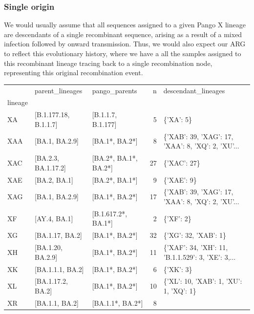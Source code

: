 \documentclass{article}
\begin{document}
\subsubsection{Single origin}
We would usually assume that all sequences assigned to a given Pango X lineage are descendants of a single recombinant sequence, arising as a result of a mixed infection followed by onward transmission. Thus, we would also expect our ARG to reflect this evolutionary history, where we have a all the samples assigned to this recombinant lineage tracing back to a single recombination node, representing this original recombination event.

\begin{table}
\begin{tabular}{lllrl}
\toprule
{} &              parent\_lineages &          pango\_parents &   n &
descendant\_lineages \\
lineage &                              &                        &     &
\\
\midrule
XA      &        [B.1.177.18, B.1.1.7] &     [B.1.1.7, B.1.177] &   5 &
\{'XA': 5\} \\
XAA     &               [BA.1, BA.2.9] &         [BA.1*, BA.2*] &   8 &
\{'XAB': 39, 'XAG': 17, 'XAA': 8, 'XQ': 2, 'XU'... \\
XAC     &          [BA.2.3, BA.1.17.2] &  [BA.2*, BA.1*, BA.2*] &  27 &
\{'XAC': 27\} \\
XAE     &                 [BA.2, BA.1] &         [BA.2*, BA.1*] &   9 &
\{'XAE': 9\} \\
XAG     &               [BA.1, BA.2.9] &         [BA.1*, BA.2*] &  17 &
\{'XAB': 39, 'XAG': 17, 'XAA': 8, 'XQ': 2, 'XU'... \\
XF      &                 [AY.4, BA.1] &    [B.1.617.2*, BA.1*] &   2 &
\{'XF': 2\} \\
XG      &              [BA.1.17, BA.2] &         [BA.1*, BA.2*] &  32 &
\{'XG': 32, 'XAB': 1\} \\
XH      &            [BA.1.20, BA.2.9] &         [BA.1*, BA.2*] &  11 &
\{'XAF': 34, 'XH': 11, 'B.1.1.529': 3, 'XE': 3,... \\
XK      &             [BA.1.1.1, BA.2] &         [BA.1*, BA.2*] &   6 &
\{'XK': 3\} \\
XL      &            [BA.1.17.2, BA.2] &         [BA.1*, BA.2*] &  10 &
\{'XL': 10, 'XAB': 1, 'XU': 1, 'XQ': 1\} \\
XR      &               [BA.1.1, BA.2] &       [BA.1.1*, BA.2*] &   8 &

\end{tabular}
\end{table}
\end{document}
